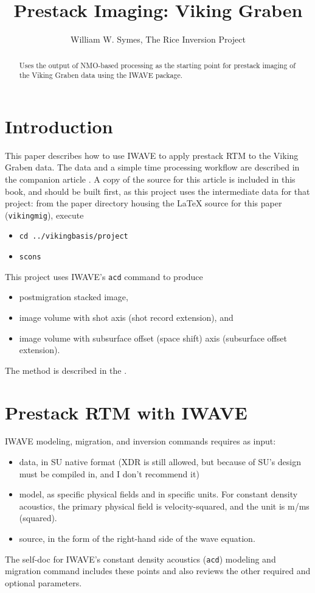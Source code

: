 \title{Prestack Imaging: Viking Graben}
\date{}
\author{William W. Symes, The Rice Inversion Project}

\maketitle 
\parskip 12pt 
\begin{abstract}
Uses the output of NMO-based processing as the starting point for prestack imaging of the Viking Graben data using the IWAVE package.
\end{abstract}


\section{Introduction}
This paper describes how to use IWAVE to apply prestack RTM to the Viking Graben data. The data and a simple time processing workflow are described in the companion article \cite[]{trip15:vikingbasic}. A copy of the source for this article is included in this book, and should be built first, as this project uses the intermediate data for that project: from the paper directory housing the LaTeX source for this paper ({\tt vikingmig}), execute 
\begin{itemize}
\item {\tt cd ../vikingbasis/project}
\item {\tt scons}
\end{itemize}

This project uses IWAVE's {\tt acd} command to produce 
\begin{itemize}
\item postmigration stacked image,
\item image volume with shot axis (shot record extension), and 
\item image volume with subsurface offset (space shift) axis (subsurface offset extension).
\end{itemize}
The method is described in the \cite[]{SymesIWEXT:15}.

\section{Prestack RTM with IWAVE}
IWAVE modeling, migration, and inversion commands requires as input:
\begin{itemize}
\item data, in SU native format (XDR is still allowed, but because of SU's design must be compiled in, and I don't recommend it)
\item model, as specific physical fields and in specific units. For constant density acoustics, the primary physical field is velocity-squared, and the unit is m/ms (squared). 
\item source, in the form of the right-hand side of the wave equation. 
\end{itemize}
The self-doc for IWAVE's constant density acoustics ({\tt acd}) modeling and migration command includes these points and also reviews the other required and optional parameters.

